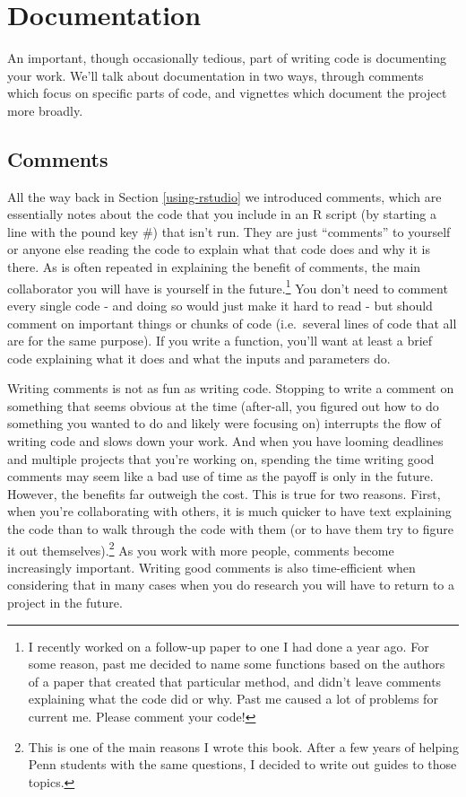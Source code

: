 \documentclass[
]{krantz}
\begin{document}
\hypertarget{documentation}{%
\section{Documentation}\label{documentation}}

An important, though occasionally tedious, part of writing code is documenting your work. We'll talk about documentation in two ways, through comments which focus on specific parts of code, and vignettes which document the project more broadly.

\hypertarget{comments}{%
\subsection{Comments}\label{comments}}

All the way back in Section \ref{using-rstudio} we introduced comments, which are essentially notes about the code that you include in an R script (by starting a line with the pound key \#) that isn't run. They are just ``comments'' to yourself or anyone else reading the code to explain what that code does and why it is there. As is often repeated in explaining the benefit of comments, the main collaborator you will have is yourself in the future.\footnote{I recently worked on a follow-up paper to one I had done a year ago. For some reason, past me decided to name some functions based on the authors of a paper that created that particular method, and didn't leave comments explaining what the code did or why. Past me caused a lot of problems for current me. Please comment your code!} You don't need to comment every single code - and doing so would just make it hard to read - but should comment on important things or chunks of code (i.e.~several lines of code that all are for the same purpose). If you write a function, you'll want at least a brief code explaining what it does and what the inputs and parameters do.

Writing comments is not as fun as writing code. Stopping to write a comment on something that seems obvious at the time (after-all, you figured out how to do something you wanted to do and likely were focusing on) interrupts the flow of writing code and slows down your work. And when you have looming deadlines and multiple projects that you're working on, spending the time writing good comments may seem like a bad use of time as the payoff is only in the future. However, the benefits far outweigh the cost. This is true for two reasons. First, when you're collaborating with others, it is much quicker to have text explaining the code than to walk through the code with them (or to have them try to figure it out themselves).\footnote{This is one of the main reasons I wrote this book. After a few years of helping Penn students with the same questions, I decided to write out guides to those topics.} As you work with more people, comments become increasingly important. Writing good comments is also time-efficient when considering that in many cases when you do research you will have to return to a project in the future.
\end{document}
